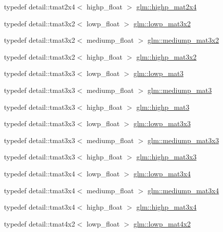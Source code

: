 \begin{DoxyCompactItemize}
typedef detail\+::tmat2x4$<$ highp\+\_\+float $>$ \hyperlink{group__core__precision_ga41deb7c45e9219ccccdc011aafd42f27}{glm\+::highp\+\_\+mat2x4}
\item 
typedef detail\+::tmat3x2$<$ lowp\+\_\+float $>$ \hyperlink{group__core__precision_ga590ba3600da3c6dc36a0eb7574cbd6f6}{glm\+::lowp\+\_\+mat3x2}
\item 
typedef detail\+::tmat3x2$<$ mediump\+\_\+float $>$ \hyperlink{group__core__precision_ga74c660239e7f6b76796f1b4990083ec6}{glm\+::mediump\+\_\+mat3x2}
\item 
typedef detail\+::tmat3x2$<$ highp\+\_\+float $>$ \hyperlink{group__core__precision_gae46e3b35f72ae06bc7d38ff29a189cfb}{glm\+::highp\+\_\+mat3x2}
\item 
typedef detail\+::tmat3x3$<$ lowp\+\_\+float $>$ \hyperlink{group__core__precision_gaf32a06a88eff09262459a4448abea9ad}{glm\+::lowp\+\_\+mat3}
\item 
typedef detail\+::tmat3x3$<$ mediump\+\_\+float $>$ \hyperlink{group__core__precision_gab9f55249d1c065a72d525f3ffd3524be}{glm\+::mediump\+\_\+mat3}
\item 
typedef detail\+::tmat3x3$<$ highp\+\_\+float $>$ \hyperlink{group__core__precision_ga28f20673ba4b1515f27a42a60900a75d}{glm\+::highp\+\_\+mat3}
\item 
typedef detail\+::tmat3x3$<$ lowp\+\_\+float $>$ \hyperlink{group__core__precision_gaf4dbe8a227cee5c02b5ab3faa0d948f5}{glm\+::lowp\+\_\+mat3x3}
\item 
typedef detail\+::tmat3x3$<$ mediump\+\_\+float $>$ \hyperlink{group__core__precision_ga21bb45bd57a97bf7b0b41e86328d72b2}{glm\+::mediump\+\_\+mat3x3}
\item 
typedef detail\+::tmat3x3$<$ highp\+\_\+float $>$ \hyperlink{group__core__precision_ga072d1e03e15a20a108632540802c9a7d}{glm\+::highp\+\_\+mat3x3}
\item 
typedef detail\+::tmat3x4$<$ lowp\+\_\+float $>$ \hyperlink{group__core__precision_ga1b202ac2d7cea4f30ad802471f6081ac}{glm\+::lowp\+\_\+mat3x4}
\item 
typedef detail\+::tmat3x4$<$ mediump\+\_\+float $>$ \hyperlink{group__core__precision_gaa530d8f06a8f1187cd1e0c2ce46cac42}{glm\+::mediump\+\_\+mat3x4}
\item 
typedef detail\+::tmat3x4$<$ highp\+\_\+float $>$ \hyperlink{group__core__precision_ga55fe92f6217fa20816f52f748fb399c7}{glm\+::highp\+\_\+mat3x4}
\item 
typedef detail\+::tmat4x2$<$ lowp\+\_\+float $>$ \hyperlink{group__core__precision_gaf8f0828066f6c6fbd2c815832743e401}{glm\+::lowp\+\_\+mat4x2}

\end{DoxyCompactItemize}
